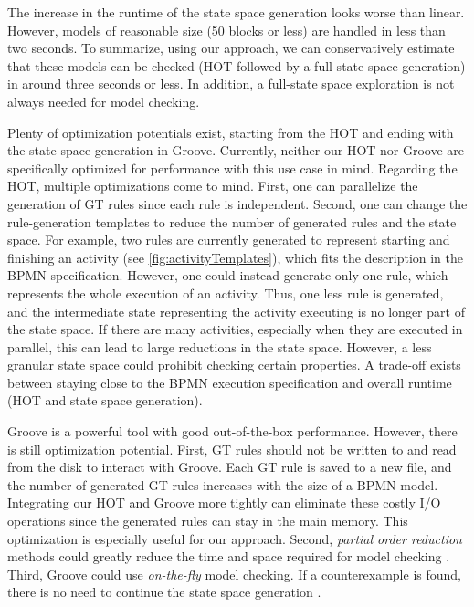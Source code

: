 \documentclass{lmcs} %
\begin{document}
The increase in the runtime of the state space generation looks worse than linear.
However, models of reasonable size (50 blocks or less) are handled in less than two seconds.
To summarize, using our approach, we can conservatively estimate that these models can be checked (HOT followed by a full state space generation) in around three seconds or less.
In addition, a full-state space exploration is not always needed for model checking.

Plenty of optimization potentials exist, starting from the HOT and ending with the state space generation in Groove.
Currently, neither our HOT nor Groove are specifically optimized for performance with this use case in mind.
Regarding the HOT, multiple optimizations come to mind.
First, one can parallelize the generation of GT rules since each rule is independent.
Second, one can change the rule-generation templates to reduce the number of generated rules and the state space.
For example, two rules are currently generated to represent starting and finishing an activity (see \autoref{fig:activityTemplates}), which fits the description in the BPMN specification.
However, one could instead generate only one rule, which represents the whole execution of an activity.
Thus, one less rule is generated, and the intermediate state representing the activity executing is no longer part of the state space.
If there are many activities, especially when they are executed in parallel, this can lead to large reductions in the state space.
However, a less granular state space could prohibit checking certain properties.
A trade-off exists between staying close to the BPMN execution specification and overall runtime (HOT and state space generation).

Groove is a powerful tool with good out-of-the-box performance.
However, there is still optimization potential.
First, GT rules should not be written to and read from the disk to interact with Groove.
Each GT rule is saved to a new file, and the number of generated GT rules increases with the size of a BPMN model.
Integrating our HOT and Groove more tightly can eliminate these costly I/O operations since the generated rules can stay in the main memory.
This optimization is especially useful for our approach.
Second, \textit{partial order reduction} methods could greatly reduce the time and space required for model checking \cite{clarkeHandbookModelChecking2018}.
Third, Groove could use \textit{on-the-fly} model checking.
If a counterexample is found, there is no need to continue the state space generation \cite{clarkeHandbookModelChecking2018}.
\end{document}

